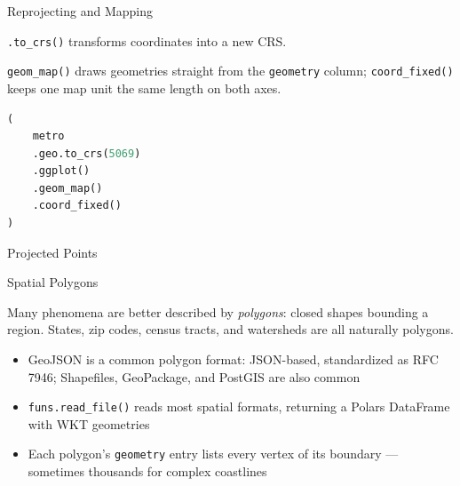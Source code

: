 \documentclass[8pt,aspectratio=169]{beamer}
\begin{document}
\begin{frame}[fragile]{Reprojecting and Mapping}
\begin{splitcode}{%

\texttt{.to\_crs()} transforms coordinates into a new CRS.

\texttt{geom\_map()} draws geometries straight from the \texttt{geometry} column; \texttt{coord\_fixed()} keeps one map unit the same length on both axes.

}
\begin{lstlisting}[language=Python]
(
    metro
    .geo.to_crs(5069)
    .ggplot()
    .geom_map()
    .coord_fixed()
)
\end{lstlisting}
\end{splitcode}
\end{frame}

\begin{rightframe}{Projected Points}
\end{rightframe}

\begin{textframe}{Spatial Polygons}

Many phenomena are better described by \textit{polygons}: closed shapes bounding a region. States, zip codes, census tracts, and watersheds are all naturally polygons.

\begin{itemize}
\item GeoJSON is a common polygon format: JSON-based, standardized as RFC 7946; Shapefiles, GeoPackage, and PostGIS are also common
\item \texttt{funs.read\_file()} reads most spatial formats, returning a Polars DataFrame with WKT geometries
\item Each polygon's \texttt{geometry} entry lists every vertex of its boundary --- sometimes thousands for complex coastlines
\end{itemize}

\end{textframe}
\end{document}
